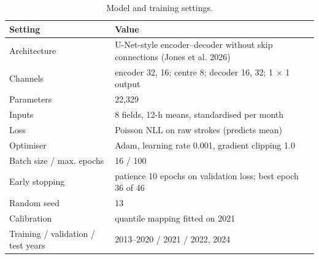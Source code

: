 \providecommand{\toprule}{\hline}\providecommand{\midrule}{\hline}\providecommand{\bottomrule}{\hline}  %
\begin{table}[ht]
\centering
\small
\caption{Model and training settings.}
\label{tab:T2_model_training}
\begin{tabular}{lp{}}
\toprule
Setting & Value \\
\midrule
Architecture & U-Net-style encoder–decoder without skip connections (Jones et al. 2026) \\
Channels & encoder 32, 16; centre 8; decoder 16, 32; 1 $\times$ 1 output \\
Parameters & 22,329 \\
Inputs & 8 fields, 12-h means, standardised per month \\
Loss & Poisson NLL on raw strokes (predicts mean) \\
Optimiser & Adam, learning rate 0.001, gradient clipping 1.0 \\
Batch size / max. epochs & 16 / 100 \\
Early stopping & patience 10 epochs on validation loss; best epoch 36 of 46 \\
Random seed & 13 \\
Calibration & quantile mapping fitted on 2021 \\
Training / validation / test years & 2013–2020 / 2021 / 2022, 2024 \\
\bottomrule
\end{tabular}
\end{table}

